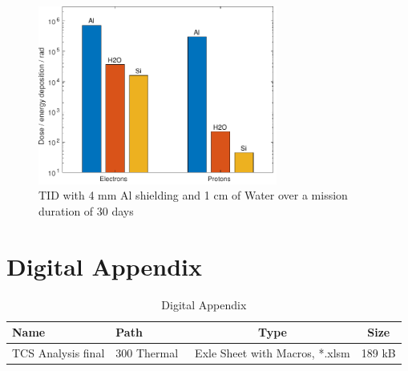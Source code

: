 

\begin{figure}[htp]
	\centering
	\includegraphics[width=0.7\textwidth]{Media/J_Improvements_Ice}
	\caption{TID with 4 mm Al shielding and 1 cm of Water over a mission duration of 30 days}
	\label{fig:Radiation_Improvements_Ice}
\end{figure}

\clearpage

\setcounter{figure}{0}
\setcounter{table}{0}

\section{Digital Appendix}		\label{app:DigitalAppendix}

\begin{table}[htb]
	\centering
	\begin{tabular}{llcc}
	\toprule
		Name  & Path & Type & Size  \\
	\midrule
		TCS Analysis final & 300 Thermal\ & Exle Sheet with Macros, *.xlsm & 189 kB  \\
	\bottomrule
	\end{tabular}
	\caption{Digital Appendix}
	\label{app:DigitalAppendix}
\end{table}

\cleardoublepage